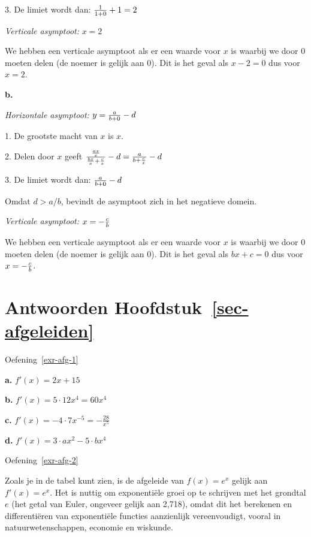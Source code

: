 \documentclass[
  a4paper,
]{scrbook}
\theoremstyle{definition}
\theoremstyle{remark}
\begin{document}
3. De limiet wordt dan: \({1 \over 1 + 0} + 1 = 2\)

\emph{Verticale asymptoot:} \(x=2\)

We hebben een verticale asymptoot als er een waarde voor \(x\) is
waarbij we door 0 moeten delen (de noemer is gelijk aan 0). Dit is het
geval als \(x-2=0\) dus voor \(x=2\).

\textbf{b.}

\emph{Horizontale asymptoot:} \(y={a \over b+0} - d\)

1. De grootste macht van \(x\) is \(x\).

2. Delen door \(x\) geeft
\({{ax \over x} \over {bx \over x}+{c \over x}} - d = {a \over b+{c \over x}} - d\)

3. De limiet wordt dan: \({a \over b+0} - d\)

Omdat \(d > a/b\), bevindt de asymptoot zich in het negatieve domein.

\emph{Verticale asymptoot:} \(x=-{c \over b}\)

We hebben een verticale asymptoot als er een waarde voor \(x\) is
waarbij we door 0 moeten delen (de noemer is gelijk aan 0). Dit is het
geval als \(bx+c=0\) dus voor \(x=-{c \over b}\).

\hypertarget{antwoorden-sec-afgeleiden}{%
\section*{\texorpdfstring{Antwoorden
Hoofdstuk~\ref{sec-afgeleiden}}{Antwoorden Hoofdstuk~}}\label{antwoorden-sec-afgeleiden}}


Oefening~\ref{exr-afg-1}

\textbf{a.} \(f'(x)=2x+15\)

\textbf{b.} \(f'(x)=5\cdot12x^4=60x^4\)

\textbf{c.} \(f'(x)=-4\cdot7x^{-5}=-\frac{28}{x^5}\)

\textbf{d.} \(f'(x)=3\cdot ax^2-5\cdot bx^4\)

Oefening~\ref{exr-afg-2}

Zoals je in de tabel kunt zien, is de afgeleide van \(f(x)=e^x\) gelijk
aan \(f'(x)=e^x\). Het is nuttig om exponentiële groei op te schrijven
met het grondtal \(e\) (het getal van Euler, ongeveer gelijk aan 2,718),
omdat dit het berekenen en differentiëren van exponentiële functies
aanzienlijk vereenvoudigt, vooral in natuurwetenschappen, economie en
wiskunde.
\end{document}
